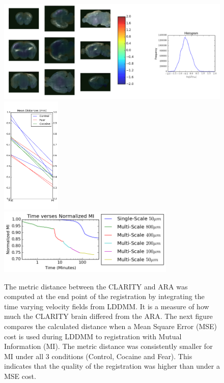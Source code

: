 \documentclass[simplex.tex]{subfiles}
\begin{document}
\begin{figure}[h!]
\begin{cframed}
\centering
\includegraphics[width=.73\textwidth]{./figs/ndreg.png}
\includegraphics[width=0.25\textwidth]{./figs/ndreg-md.png}\\
\includegraphics[width=0.75\textwidth]{./figs/ndreg-time.png}
\caption{
  The metric distance between the CLARITY and ARA was computed at the
  end point of the registration by integrating the time varying velocity
  fields from LDDMM.  It is a measure of how much the CLARITY brain
  differed from the ARA. The next figure compares the calculated
  distance when a Mean Square Error (MSE) cost is used during LDDMM to
  registration with Mutual Information (MI).  The metric distance was
  consistently smaller for MI under all 3 conditions (Control, Cocaine
  and Fear).  This indicates that the quality of the registration was
  higher than under a MSE cost.
}
\label{fig:ndreg}
\end{cframed}
\end{figure}
\end{document}
